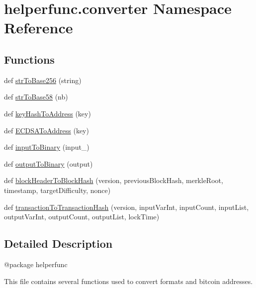\hypertarget{namespacehelperfunc_1_1converter}{}\section{helperfunc.\+converter Namespace Reference}
\label{namespacehelperfunc_1_1converter}
\subsection*{Functions}
\begin{DoxyCompactItemize}
\item 
def \hyperlink{namespacehelperfunc_1_1converter_a9a2e37b956c47478d1851319ad44fdca}{str\+To\+Base256} (string)
\item 
def \hyperlink{namespacehelperfunc_1_1converter_aba1430a1851d8d77889e199481f0f9e5}{str\+To\+Base58} (nb)
\item 
def \hyperlink{namespacehelperfunc_1_1converter_a94a74edadc3eaf6a0ef0ebab56bc831a}{key\+Hash\+To\+Address} (key)
\item 
def \hyperlink{namespacehelperfunc_1_1converter_a284dabfc8466c39993ae03130b7a586f}{E\+C\+D\+S\+A\+To\+Address} (key)
\item 
def \hyperlink{namespacehelperfunc_1_1converter_ac2ac1dcd5face751bd0886e64cb0380e}{input\+To\+Binary} (input\+\_\+)
\item 
def \hyperlink{namespacehelperfunc_1_1converter_a2a40d8c9909c19ad8845f90a049c2fa5}{output\+To\+Binary} (output)
\item 
def \hyperlink{namespacehelperfunc_1_1converter_a9c580f289e898f0df9484edf3579a185}{block\+Header\+To\+Block\+Hash} (version, previous\+Block\+Hash, merkle\+Root, timestamp, target\+Difficulty, nonce)
\item 
def \hyperlink{namespacehelperfunc_1_1converter_a840fa6c5d780a1ba87bcde23a60a7907}{transaction\+To\+Transaction\+Hash} (version, input\+Var\+Int, input\+Count, input\+List, output\+Var\+Int, output\+Count, output\+List, lock\+Time)
\end{DoxyCompactItemize}


\subsection{Detailed Description}
\begin{DoxyVerb}@package helperfunc

This file contains several functions used to convert formats and bitcoin addresses.
\end{DoxyVerb}
 

